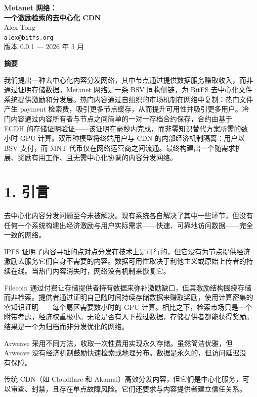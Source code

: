 \documentclass[11pt,a4paper]{article}
\renewenvironment{abstract}{%
  \begin{center}
    \bfseries 摘要
  \end{center}
  \itshape
}{\par\bigskip}
\begin{document}
\begin{center}
  {\LARGE\bfseries Metanet 网络：\\[0.3em]
  一个激励检索的去中心化 CDN}\\[1.5em]
  {\large Alex Tong}\\[0.3em]
  \texttt{alex@bitfs.org}\\[0.8em]
  {\small 版本 0.0.1 --- 2026 年 3 月}\\[1.5em]
\end{center}

\begin{abstract}
我们提出一种去中心化内容分发网络，其中节点通过提供数据服务赚取收入，而非通过证明存储数据。Metanet 网络是一条 BSV 同构侧链，为 BitFS 去中心化文件系统提供激励和分发层。热门内容通过自组织的市场机制在网络中复制：热门文件产生 payment 检索费，吸引更多节点缓存，从而提升可用性并吸引更多用户。冷门内容通过内容所有者与节点之间简单的一对一存档合约保存，合约由基于 ECDH 的存储证明验证——该证明在毫秒内完成，而非零知识替代方案所需的数小时 GPU 计算。双币种模型将终端用户与 CDN 的内部经济机制隔离：用户以 BSV 支付，而 MNT 代币仅在网络运营商之间流通。最终构建出一个随需求扩展、奖励有用工作、且无需中心化协调的内容分发网络。
\end{abstract}

\section{1. 引言}

去中心化内容分发问题至今未被解决。现有系统各自解决了其中一些环节，但没有任何一个系统构建出经济激励与用户实际需求——快速、可靠地访问数据——完全一致的网络。

IPFS 证明了内容寻址的点对点分发在技术上是可行的，但它没有为节点提供经济激励去服务它们自身不需要的内容。数据可用性取决于利他主义或原始上传者的持续在线。当热门内容消失时，网络没有机制来恢复它。

Filecoin 通过付费让存储提供者持有数据来弥补激励缺口，但其激励结构围绕存储而非检索。提供者通过证明自己随时间持续存储数据来赚取奖励，使用计算密集的零知识证明——每个扇区需要数小时的 GPU 计算。相比之下，检索市场只是一个附带考虑，经济权重极小。无论是否有人下载过数据，存储提供者都能获得奖励。结果是一个为归档而非分发优化的网络。

Arweave 采用不同方法，收取一次性费用实现永久存储。虽然简洁优雅，但 Arweave 没有经济机制鼓励快速检索或地理分布。数据是永久的，但访问延迟没有保障。

传统 CDN（如 Cloudflare 和 Akamai）高效分发内容，但它们是中心化服务，可以审查、封禁，且存在单点故障风险。它们还要求与内容提供者建立信任关系。
\end{document}
